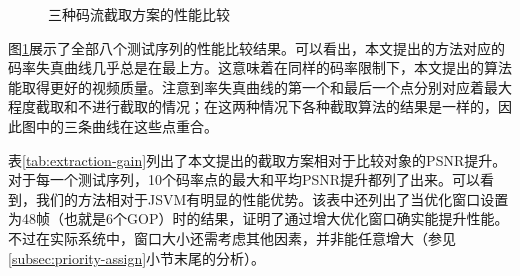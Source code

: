 \begin{figure}[!ht]
{		\label{fig:Football}}
	\qquad
	\caption{三种码流截取方案的性能比较}
	\label{fig:extraction-performance}
\end{figure}

图\ref{fig:extraction-performance}展示了全部八个测试序列的性能比较结果。可以看出，本文提出的方法对应的码率失真曲线几乎总是在最上方。这意味着在同样的码率限制下，本文提出的算法能取得更好的视频质量。注意到率失真曲线的第一个和最后一个点分别对应着最大程度截取和不进行截取的情况；在这两种情况下各种截取算法的结果是一样的，因此图中的三条曲线在这些点重合。

表\ref{tab:extraction-gain}列出了本文提出的截取方案相对于比较对象的PSNR提升。对于每一个测试序列，10个码率点的最大和平均PSNR提升都列了出来。可以看到，我们的方法相对于JSVM有明显的性能优势。该表中还列出了当优化窗口设置为48帧（也就是6个GOP）时的结果，证明了通过增大优化窗口确实能提升性能。不过在实际系统中，窗口大小还需考虑其他因素，并非能任意增大（参见\ref{subsec:priority-assign}小节末尾的分析）。

